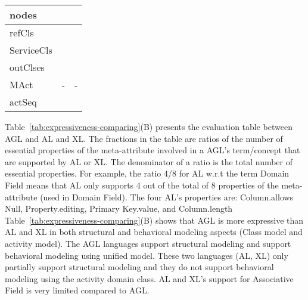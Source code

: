 \begin{table}[]
\begin{tabular}{|l|l|l|}
		nodes                              &                                                                                             &                                                                                        \\ \hline
		refCls                             &                                                                                             &                                                                                        \\ \hline
		ServiceCls                         &                                                                                             &                                                                                        \\ \hline
		outClses                           &                                                                                             &                                                                                        \\ \hline
		MAct                               & -                                                                                           & -                                                                                      \\ \hline
		actSeq                             &                                                                                             &                                                                                        \\ \hline
	\end{tabular}
\end{table}
Table~\ref{tab:expressiveness-comparing}(B) presents the evaluation table between AGL and AL and XL. The fractions in the table are ratios of the number of essential properties of the meta-attribute involved in a AGL’s term/concept that are supported by AL or XL. The denominator of a ratio is the total number of essential properties. For example, the ratio 4/8 for AL w.r.t the term Domain Field means that AL only supports 4 out of the total of 8 properties of the meta-attribute  (used in Domain Field). The four AL’s properties are: Column.allows Null, Property.editing, Primary Key.value, and Column.length Table~\ref{tab:expressiveness-comparing}(B) shows that AGL is more expressive than AL and XL in both structural and behavioral modeling aspects (Class model and activity model). The AGL languages support structural modeling and support behavioral modeling using unified model.  These two languages (AL, XL) only partially support structural modeling and they do not support behavioral modeling using the activity domain class. AL and XL’s support for Associative Field is very limited compared to AGL.


